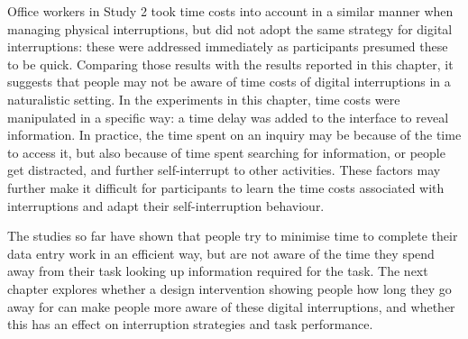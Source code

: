 Office workers in Study 2 took time costs into account in a similar manner when managing physical interruptions, but did not adopt the same strategy for digital interruptions: these were addressed immediately as participants presumed these to be quick. Comparing those results with the results reported in this chapter, it suggests that people may not be aware of time costs of digital interruptions in a naturalistic setting. In the experiments in this chapter, time costs were manipulated in a specific way: a time delay was added to the interface to reveal information. In practice, the time spent on an inquiry may be because of the time to access it, but also because of time spent searching for information, or people get distracted, and further self-interrupt to other activities. These factors may further make it difficult for participants to learn the time costs associated with interruptions and adapt their self-interruption behaviour. 

The studies so far have shown that people try to minimise time to complete their data entry work in an efficient way, but are not aware of the time they spend away from their task looking up information required for the task. The next chapter explores whether a design intervention showing people how long they go away for can make people more aware of these digital interruptions, and whether this has an effect on interruption strategies and task performance.